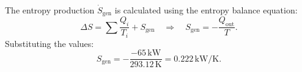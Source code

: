 The entropy production \( \dot{S}_{\text{gen}} \) is calculated using the entropy balance equation:  
\[
\Delta S = \sum \frac{Q_i}{T_i} + S_{\text{gen}} \quad \Rightarrow \quad S_{\text{gen}} = -\frac{Q_{\text{out}}}{T}.
\]  
Substituting the values:  
\[
S_{\text{gen}} = -\frac{-65 \, \text{kW}}{293.12 \, \text{K}} = 0.222 \, \text{kW/K}.
\]